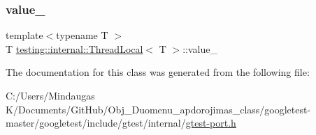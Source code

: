 \subsubsection{\texorpdfstring{value\_}{value\_}}
{\footnotesize\ttfamily template$<$typename T $>$ \\
T \mbox{\hyperlink{classtesting_1_1internal_1_1_thread_local}{testing\+::internal\+::\+Thread\+Local}}$<$ T $>$\+::value\+\_\+\hspace{0.3cm}{\ttfamily [private]}}



The documentation for this class was generated from the following file\+:\begin{DoxyCompactItemize}
\item 
C\+:/\+Users/\+Mindaugas K/\+Documents/\+Git\+Hub/\+Obj\+\_\+\+Duomenu\+\_\+apdorojimas\+\_\+class/googletest-\/master/googletest/include/gtest/internal/\mbox{\hyperlink{googletest-master_2googletest_2include_2gtest_2internal_2gtest-port_8h}{gtest-\/port.\+h}}\end{DoxyCompactItemize}
